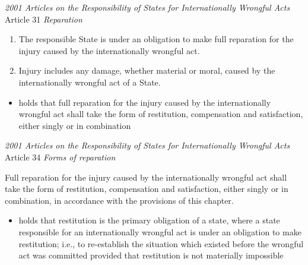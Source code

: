 \begin{conventiondetails}{\textit{2001 Articles on the Responsibility of States for Internationally Wrongful Acts} Article 31}
    \flushleft
    \textit{Reparation}
    \begin{enumerate}
        \item The responsible State is under an obligation to make full reparation for the injury caused by the internationally wrongful act.
        \item Injury includes any damage, whether material or moral, caused by the internationally wrongful act of a State.
    \end{enumerate}
\end{conventiondetails}

\begin{itemize}
    \item {} holds that full reparation for the injury caused by the internationally wrongful act shall take the form of restitution, compensation and satisfaction, either singly or in combination
\end{itemize}

\begin{conventiondetails}{\textit{2001 Articles on the Responsibility of States for Internationally Wrongful Acts} Article 34}
    \flushleft
    \textit{Forms of reparation}

    \vspace{\baselineskip}

    Full reparation for the injury caused by the internationally wrongful act shall take the form of restitution, compensation and satisfaction, either singly or in combination, in accordance with the provisions of this chapter.
\end{conventiondetails}

\begin{itemize}
    \item {} holds that restitution is the primary obligation of a state, where a state responsible for an internationally wrongful act is under an obligation to make restitution; i.e., to re-establish the situation which existed before the wrongful act was committed provided that restitution is not materially impossible
\end{itemize}

